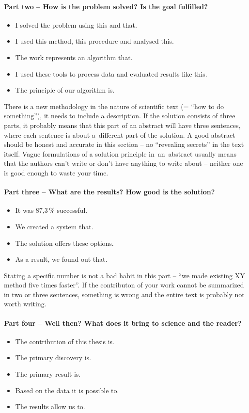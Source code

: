 \paragraph{Part two -- How is the problem solved? Is the goal fulfilled?}
\begin{itemize}
  \item{I solved the problem using this and that.}
  \item{I used this method, this procedure and analysed this.}
  \item{The work represents an algorithm that.}
  \item{I used these tools to process data and evaluated results like this.}
  \item{The principle of our algorithm is.}
\end{itemize}

There is a new methodology in the nature of scientific text (= ``how to do something''), it needs to include a description. If the solution consists of three parts, it probably means that this part of an abstract will have three sentences, where each sentence is about a~different part of the solution. A good abstract should be honest and accurate in this section -- no ``revealing secrets'' in the text itself. Vague formulations of a solution principle in~an~abstract usually means that the authors can't write or don't have anything to write about -- neither one is good enough to waste your time.

\paragraph{Part three -- What are the results? How good is the solution?}
\begin{itemize}
  \item{It was 87,3\,\% successful.}
  \item{We created a system that.}
  \item{The solution offers these options.}
  \item{As a result, we found out that.}
\end{itemize}

Stating a specific number is not a bad habit in this part -- ``we made existing XY method five times faster''. If the contributon of your work cannot be summarized in two or three sentences, something is wrong and the entire text is probably not worth writing.

\paragraph{Part four -- Well then? What does it bring to science and the reader?}
\begin{itemize}
  \item{The contribution of this thesis is.}
  \item{The primary discovery is.}
  \item{The primary result is.}
  \item{Based on the data it is possible to.}
  \item{The results allow us to.}
\end{itemize}

